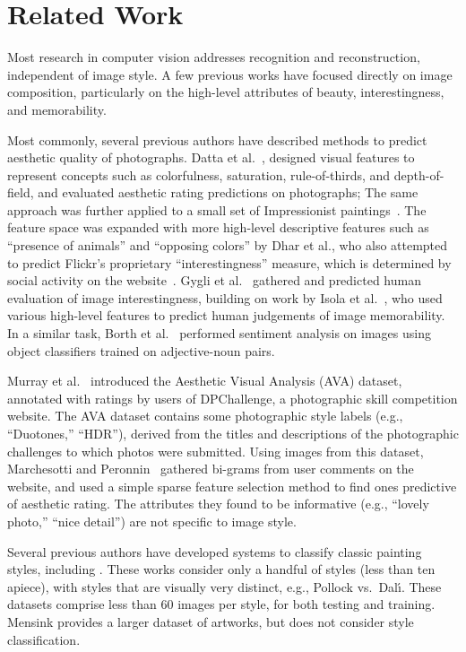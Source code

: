 \section{Related Work}

Most research in computer vision addresses recognition and reconstruction, independent of image style.
A few previous works have focused directly on image composition, particularly on the high-level attributes of beauty, interestingness, and memorability.

Most commonly, several previous authors have described methods to predict aesthetic quality of photographs.
Datta et al.~\cite{Datta-ECCV-2006}, designed visual features to represent concepts such as colorfulness, saturation, rule-of-thirds, and depth-of-field, and evaluated aesthetic rating predictions on photographs; The same approach was further applied to a small set of Impressionist paintings~\cite{Li-SP-2009}.
The feature space was expanded with more high-level descriptive features such as ``presence of animals'' and ``opposing colors'' by Dhar et al., who also attempted to predict Flickr's proprietary ``interestingness'' measure, which is determined by social activity on the website~\cite{Dhar-CVPR-2011}.
Gygli et al.~\cite{Gygli-ICCV-2013} gathered and predicted human evaluation of image interestingness, building on work by Isola et al.~\cite{Isola-CVPR-2011}, who used various high-level features to predict human judgements of image memorability.
In a similar task, Borth et al.~\cite{Borth-MM-2013} performed sentiment analysis on images using object classifiers trained on adjective-noun pairs.

Murray et al.~\cite{Murray-CVPR-2012} introduced the Aesthetic Visual Analysis (AVA) dataset, annotated with ratings by users of DPChallenge, a photographic skill competition website.
The AVA dataset contains some photographic style labels (e.g., ``Duotones,'' ``HDR''), derived from the titles and descriptions of the photographic challenges to which photos were submitted.
Using images from this dataset, Marchesotti and Peronnin~\cite{Marchesotti-BMVC-2013} gathered bi-grams from user comments on the website, and used a simple sparse feature selection method to find ones predictive of aesthetic rating.
The attributes they found to be informative (e.g., ``lovely photo,'' ``nice detail'') are not specific to image style.

Several previous authors have developed systems to classify classic painting styles, including \cite{keren2002,shamir2010}.
These works consider only a handful of styles (less than ten apiece), with styles that are visually very distinct, e.g., Pollock vs.~Dal\'{\i}.
These datasets comprise less than 60 images per style, for both testing and training.
Mensink \cite{Mensink2014} provides a larger dataset of artworks, but does not consider style classification.
